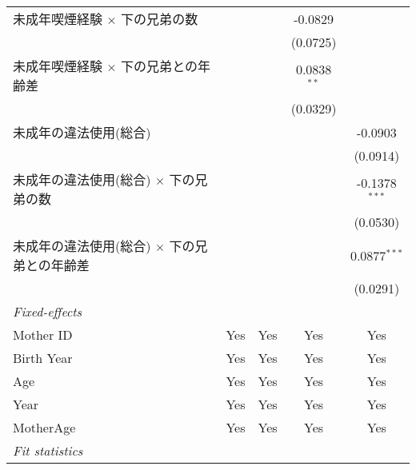\documentclass{article}
\begin{document}
\begin{landscape}
\begin{threeparttable}[b]
\begin{tabular}{lcccc}
      未成年喫煙経験 $\times$ 下の兄弟の数                &                &                 & -0.0829       &   \\   
                                                          &                &                 & (0.0725)      &   \\   
      未成年喫煙経験 $\times$ 下の兄弟との年齢差          &                &                 & 0.0838$^{**}$ &   \\   
                                                          &                &                 & (0.0329)      &   \\   
      未成年の違法使用(総合)                              &                &                 &               & -0.0903\\   
                                                          &                &                 &               & (0.0914)\\   
      未成年の違法使用(総合) $\times$ 下の兄弟の数        &                &                 &               & -0.1378$^{***}$\\   
                                                          &                &                 &               & (0.0530)\\   
      未成年の違法使用(総合) $\times$ 下の兄弟との年齢差  &                &                 &               & 0.0877$^{***}$\\   
                                                          &                &                 &               & (0.0291)\\   
      \midrule
      \emph{Fixed-effects}\\
      Mother ID                                           & Yes            & Yes             & Yes           & Yes\\  
      Birth Year                                          & Yes            & Yes             & Yes           & Yes\\  
      Age                                                 & Yes            & Yes             & Yes           & Yes\\  
      Year                                                & Yes            & Yes             & Yes           & Yes\\  
      MotherAge                                           & Yes            & Yes             & Yes           & Yes\\  
      \midrule
      \emph{Fit statistics}\\

\end{tabular}
\end{threeparttable}
\end{landscape}
\end{document}
